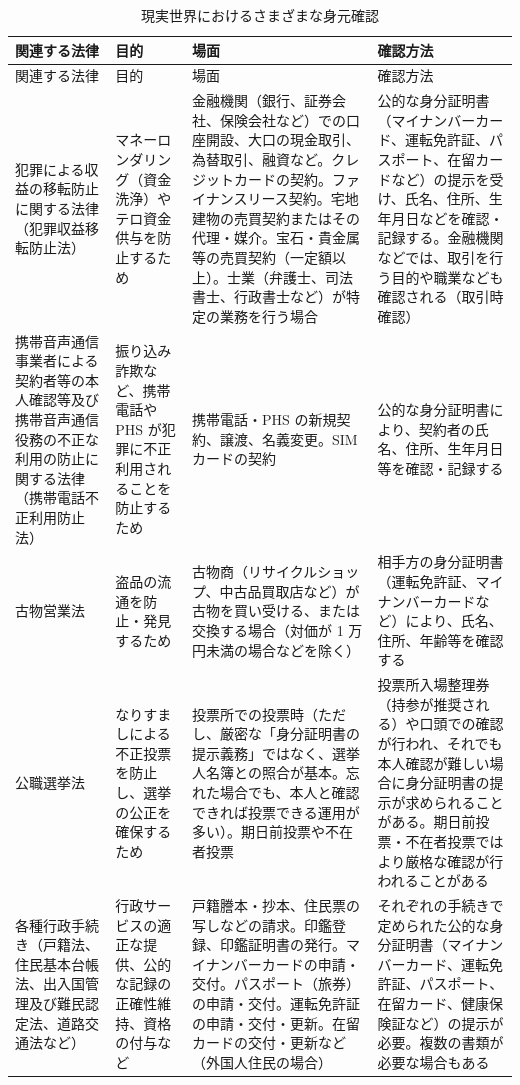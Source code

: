 \documentclass[uplatex]{jsarticle}
\def\label#1{}%
\begin{document}
{\small
\begin{longtable}{|p{}|p{}|p{}|p{}|}
\caption{現実世界におけるさまざまな身元確認}\label{tab:ch2-real-world-proofing}\\
\hline
関連する法律 & 目的 & 場面 & 確認方法 \\ \hline
\endfirsthead
\hline
関連する法律 & 目的 & 場面 & 確認方法 \\ \hline
\endhead
\hline
\endfoot
犯罪による収益の移転防止に関する法律（犯罪収益移転防止法）
& マネーロンダリング（資金洗浄）やテロ資金供与を防止するため
& 金融機関（銀行、証券会社、保険会社など）での口座開設、大口の現金取引、為替取引、融資など。クレジットカードの契約。ファイナンスリース契約。宅地建物の売買契約またはその代理・媒介。宝石・貴金属等の売買契約（一定額以上）。士業（弁護士、司法書士、行政書士など）が特定の業務を行う場合
& 公的な身分証明書（マイナンバーカード、運転免許証、パスポート、在留カードなど）の提示を受け、氏名、住所、生年月日などを確認・記録する。金融機関などでは、取引を行う目的や職業なども確認される（取引時確認） \\ \hline
携帯音声通信事業者による契約者等の本人確認等及び携帯音声通信役務の不正な利用の防止に関する法律（携帯電話不正利用防止法）
& 振り込み詐欺など、携帯電話や PHS が犯罪に不正利用されることを防止するため
& 携帯電話・PHS の新規契約、譲渡、名義変更。SIM カードの契約
& 公的な身分証明書により、契約者の氏名、住所、生年月日等を確認・記録する \\ \hline
古物営業法
& 盗品の流通を防止・発見するため
& 古物商（リサイクルショップ、中古品買取店など）が古物を買い受ける、または交換する場合（対価が 1 万円未満の場合などを除く）
& 相手方の身分証明書（運転免許証、マイナンバーカードなど）により、氏名、住所、年齢等を確認する \\ \hline
公職選挙法
& なりすましによる不正投票を防止し、選挙の公正を確保するため
& 投票所での投票時（ただし、厳密な「身分証明書の提示義務」ではなく、選挙人名簿との照合が基本。忘れた場合でも、本人と確認できれば投票できる運用が多い）。期日前投票や不在者投票
& 投票所入場整理券（持参が推奨される）や口頭での確認が行われ、それでも本人確認が難しい場合に身分証明書の提示が求められることがある。期日前投票・不在者投票ではより厳格な確認が行われることがある \\ \hline
各種行政手続き（戸籍法、住民基本台帳法、出入国管理及び難民認定法、道路交通法など）
& 行政サービスの適正な提供、公的な記録の正確性維持、資格の付与など
& 戸籍謄本・抄本、住民票の写しなどの請求。印鑑登録、印鑑証明書の発行。マイナンバーカードの申請・交付。パスポート（旅券）の申請・交付。運転免許証の申請・交付・更新。在留カードの交付・更新など（外国人住民の場合）
& それぞれの手続きで定められた公的な身分証明書（マイナンバーカード、運転免許証、パスポート、在留カード、健康保険証など）の提示が必要。複数の書類が必要な場合もある \\ \hline
\end{longtable}
}
\end{document}
